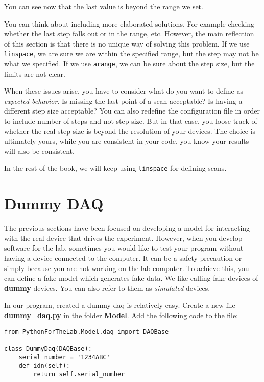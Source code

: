 You can see now that the last value is beyond the range we set.

You can think about including more elaborated solutions. For example checking whether the last step falls out or in the range, etc. However, the main reflection of this section is that there is no unique way of solving this problem. If we use \texttt{linspace}, we are sure we are within the specified range, but the step may not be what we specified. If we use \texttt{arange}, we can be sure about the step size, but the limits are not clear. 

When these issues arise, you have to consider what do you want to define as \textit{expected behavior}. Is missing the last point of a scan acceptable? Is having a different step size acceptable? You can also redefine the configuration file in order to include number of steps and not step size. But in that case, you loose track of whether the real step size is beyond the resolution of your devices. The choice is ultimately yours, while you are consistent in your code, you know your results will also be consistent. 

In the rest of the book, we will keep using \texttt{linspace} for defining scans.


\section{Dummy DAQ}\label{dummy-daq}
The previous sections have been focused on developing a model for interacting with the real device that drives the experiment. However, when you develop software for the lab, sometimes you would like to test your program without having a device connected to the computer. It can be a safety precaution or simply because you are not working on the lab computer. To achieve this, you can define a fake model which generates fake data. We like calling fake devices of \textbf{dummy} devices. You can also refer to them as \textit{simulated} devices. 

In our program, created a dummy daq is relatively easy. Create a new file \textbf{dummy\_daq.py} in the folder \textbf{Model}. Add the following code to the file:

\begin{verbatim}
from PythonForTheLab.Model.daq import DAQBase

class DummyDaq(DAQBase):
    serial_number = '1234ABC'
    def idn(self):
        return self.serial_number
\end{verbatim}

